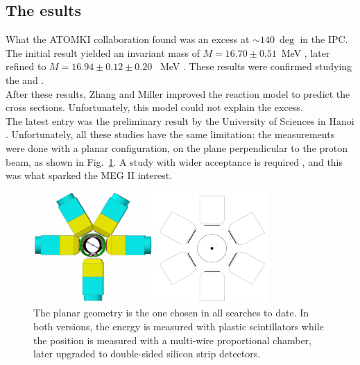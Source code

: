 \begin{refsection}
    \subsection{The esults}
        What the ATOMKI collaboration found was an excess at $\sim\SI{140}{\deg}$ in the IPC. 
        The initial result yielded an invariant mass of $M = 16.70\pm0.51$~MeV \cite{X17:Anomaly:2015}, later refined to $M=16.94\pm0.12\pm0.20$~ MeV \cite{X17:2023}.
        These results were confirmed studying the  and .\\
        After these results, Zhang and Miller \cite{X17:Zhang:2017}\cite{X17:Zhang:2020}\cite{X17:Zahng:2021} improved the reaction model to predict the cross sections. 
        Unfortunately, this model could not explain the excess.\\
        The latest entry was the preliminary result by the  University of Sciences in Hanoi \cite{X17:Hanoi:2023}.
        Unfortunately, all these studies have the same limitation: the measurements were done with a planar configuration,  on the plane perpendicular to the proton beam, as shown in Fig.~\ref{fig:X17:ATOMKI}.
        A study with wider acceptance is required \cite{X17:2023}, and this was what sparked the MEG II interest.

        \begin{figure}
            \centering
            \includegraphics[width = 0.8\textwidth]{Figures/X17/Atomki_geometry.png}
            \caption{The planar geometry is the one chosen in all searches to date. In both versions, the energy is measured with plastic scintillators while the position is measured with a multi-wire proportional chamber, later upgraded to double-sided silicon strip detectors.}
            \label{fig:X17:ATOMKI}
        \end{figure}
        

\end{refsection}
